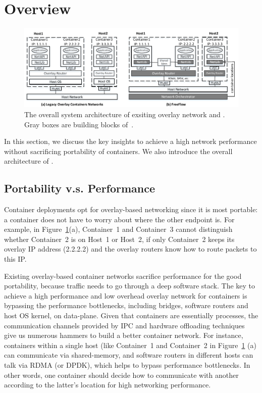 \section{Overview} \label{sec:overview}

\begin{figure}[t!] 
     \centering 
     \includegraphics[width=7in]{figures/system-arch.pdf} 
    \caption{\label{fig:sysarch} The overall system architecture of exsiting overlay network and \sysname. Gray boxes are building blocks of~\sysname.} 
\end{figure} 

In this section, we discuss the key insights to achieve a high network
performance without sacrificing portability of containers. We also 
introduce the overall architecture of \sysname. 


\subsection{Portability v.s. Performance}
Container deployments opt for overlay-based networking since it is most
portable: a container does not have to worry about where the other endpoint is.
For example, in Figure~\ref{fig:sysarch}(a), Container~1 and Container~3 cannot
distinguish whether Container~2 is on Host~1 or Host~2, if only Container~2
keeps its overlay IP address (2.2.2.2) and the overlay routers know how to
route packets to this IP. 

Existing overlay-based container networks sacrifice performance for 
the good portability, because traffic needs to go through a deep software 
stack. 
The key to achieve a high performance and low overhead overlay network for
containers is bypassing the performance bottlenecks, including bridges, software
routers and host OS kernel, on data-plane. Given that containers are essentially
processes, the communication channels provided by IPC and hardware offloading
techniques give us numerous hammers to build a better container network. For
instance, containers within a single host (like Container~1 and Container~2 in
Figure~\ref{fig:sysarch} (a) 
can communicate via shared-memory, and software routers
in different hosts can talk via RDMA (or DPDK), which helps to bypass performance
bottlenecks. In other words, one container should decide how to communicate
with another according to the latter's location for high networking performance. 

